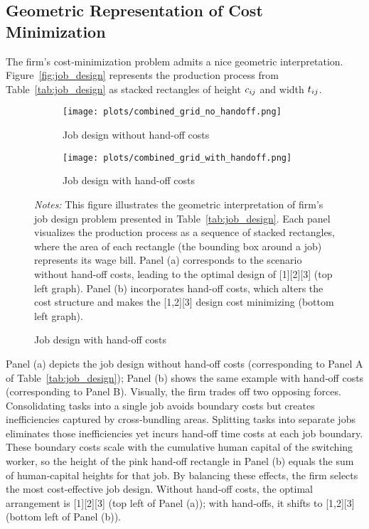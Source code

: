 \documentclass{article}
\theoremstyle{plain}
\theoremstyle{plain}
\begin{document}
\subsection{Geometric Representation of Cost Minimization}
The firm’s cost‐minimization problem admits a nice geometric interpretation.  
Figure~\ref{fig:job_design} represents the production process from Table~\ref{tab:job_design} as stacked rectangles of height $c_{ij}$ and width $t_{ij}$.
\begin{figure}[htbp]
  \begin{center}
  \caption{Geometric interpretation of job designs for the \(\tau=3\) tasks example} \label{fig:job_design}
  \begin{subfigure}[b]{0.93\textwidth}
    \texttt{[image: plots/combined\_grid\_no\_handoff.png]}
    \caption{Job design without hand-off costs}
  \end{subfigure}
  \hfill
  \begin{subfigure}[b]{0.93\textwidth}
    \texttt{[image: plots/combined\_grid\_with\_handoff.png]}
    \caption{Job design with hand-off costs}
  \end{subfigure}
  \end{center}
  \footnotesize{\emph{Notes:} This figure illustrates the geometric interpretation of firm's job design problem presented in Table~\ref{tab:job_design}. Each panel visualizes the production process as a sequence of stacked rectangles, where the area of each rectangle (the bounding box around a job) represents its wage bill. Panel (a) corresponds to the scenario without hand-off costs, leading to the optimal design of [1][2][3] (top left graph). Panel (b) incorporates hand-off costs, which alters the cost structure and makes the [1,2][3] design cost minimizing (bottom left graph).}
\end{figure}
Panel (a) depicts the job design without hand‐off costs (corresponding to Panel A of Table~\ref{tab:job_design}); Panel (b) shows the same example with hand‐off costs (corresponding to Panel B).  
Visually, the firm trades off two opposing forces.
Consolidating tasks into a single job avoids boundary costs but creates inefficiencies captured by cross‐bundling areas.  
Splitting tasks into separate jobs eliminates those inefficiencies yet incurs hand‐off time costs at each job boundary.  
These boundary costs scale with the cumulative human capital of the switching worker, so the height of the pink hand‐off rectangle in Panel (b) equals the sum of human‐capital heights for that job.
By balancing these effects, the firm selects the most cost‐effective job design.  
Without hand‐off costs, the optimal arrangement is [1][2][3] (top left of Panel (a)); with hand‐offs, it shifts to [1,2][3] (bottom left of Panel (b)).  
\end{document}
